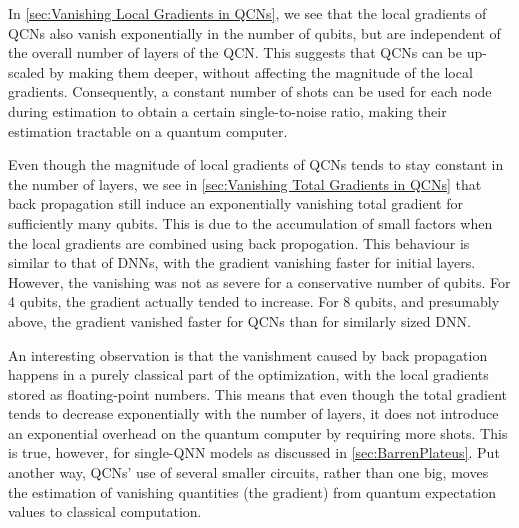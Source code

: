 In \autoref{sec:Vanishing Local Gradients in QCNs}, we see that the local gradients of QCNs also vanish exponentially in the number of qubits, but are independent of the overall number of layers of the QCN. This suggests that QCNs can be up-scaled by making them deeper, without affecting the magnitude of the local gradients. Consequently, a constant number of shots can be used for each node during estimation to obtain a certain single-to-noise ratio, making their estimation tractable on a quantum computer. 

Even though the magnitude of local gradients of QCNs tends to stay constant in the number of layers, we see in \autoref{sec:Vanishing Total Gradients in QCNs} that back propagation still induce an exponentially vanishing total gradient for sufficiently many qubits. This is due to the accumulation of small factors when the local gradients are combined using back propogation. This behaviour is similar to that of DNNs, with the gradient vanishing faster for initial layers. However, the vanishing was not as severe for a conservative number of qubits. For 4 qubits, the gradient actually tended to increase. For 8 qubits, and presumably above, the gradient vanished faster for QCNs than for similarly sized DNN.  

An interesting observation is that the vanishment caused by back propagation happens in a purely classical part of the optimization, with the local gradients stored as floating-point numbers. This means that even though the total gradient tends to decrease exponentially with the number of layers, it does not introduce an exponential overhead on the quantum computer by requiring more shots. This is true, however, for single-QNN models as discussed in \autoref{sec:BarrenPlateus}. Put another way, QCNs' use of several smaller circuits, rather than one big, moves the estimation of vanishing quantities (the gradient) from quantum expectation values to classical computation. 



